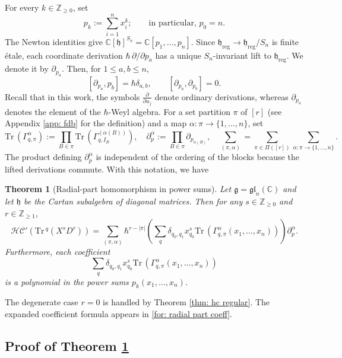 \documentclass[11pt,reqno]{amsart}
\newtheorem{theorem}{Theorem}[section]
\theoremstyle{definition}
\newcommand{\bbC}{\mathbb{C}}
\newcommand{\bbZ}{\mathbb{Z}}
\newcommand{\gl}{\mathfrak{gl}}
\newcommand{\Tr}{\mathrm{Tr} \,}
\newcommand{\fkg}{\mathfrak{g}}
\newcommand{\fkh}{\mathfrak{h}}
\newcommand{\hc}{\mathcal{HC}}
\newcommand{\reg}{\mathrm{reg}}
\newcommand{\pa}{\partial}
\begin{document}
For every \(k\in\bbZ_{\geq0}\), set
\[
p_k:=\sum_{i=1}^n x_i^k;
\qquad\text{in particular, }p_0=n.
\]
The Newton identities give
\(\bbC[\fkh]^{S_n}=\bbC[p_1,\ldots,p_n]\).  Since
\(\fkh_{\reg}\to\fkh_{\reg}/S_n\) is finite \'{e}tale, each coordinate
derivation \(\hbar\,\partial/\partial p_a\) has a unique
\(S_n\)-invariant lift to \(\fkh_{\reg}\).  We denote it by
\(\partial_{p_a}\).  Then, for \(1\leq a,b\leq n\),
\[
[\partial_{p_a},p_b]=\hbar\delta_{a,b},
\qquad
[\partial_{p_a},\partial_{p_b}]=0.
\]
Recall that in this work, the symbols
\(\frac{\partial}{\partial u_j}\) denote ordinary derivations,
whereas \(\partial_{p_a}\) denotes the element of the \(\hbar\)-Weyl algebra.
For a set partition \(\pi\) of \([r]\) (see Appendix \ref{app: fdb} for the definition) and a map 
\(\alpha:\pi\to\{1,\dots,n\}\), set
\[
	\Tr(\Gamma_{q,\pi}^{\alpha})
	:=
	\prod_{B\in\pi}
	\Tr\!\left(\Gamma_{q,I_B}^{(\alpha(B))}\right),
	\quad
		\partial_p ^\alpha
	:=
	\prod_{B\in\pi}
	\partial_{p_{\alpha(B)}},
	\quad
	\sum_{(\pi,\alpha)}
	=
	\sum_{\pi\in\Pi([r])}
		\sum_{\alpha:\pi\to\{1,\dots,n\}}.
	\]
The product defining \(\partial_p^\alpha\) is independent of the
ordering of the blocks because the lifted derivations commute.
With this notation, we have

\begin{theorem}[Radial-part homomorphism in power sums]
\label{thm: radial part}
Let \(\fkg=\gl_n(\bbC)\) and let \(\fkh\) be the 
Cartan subalgebra of diagonal matrices.
Then for any \(s\in\bbZ_{\geq 0}\) and \(r \in \bbZ_{\geq 1}\),
\begin{equation*}
\hc'(\Tr^q(X^sD^r))
=
		\sum_{(\pi,\alpha)}
		\hbar^{r - |\pi|}
		\left(
		\sum_{q}
		{\delta_{q_0,q_1}} x_{q_0}^s
		\Tr(\Gamma_{q,\pi}^{\alpha}(x_1,\dots,x_n))
		\right)
		\pa^\alpha_p.
\end{equation*}
Furthermore, each coefficient
\[
\sum_q {\delta_{q_0, q_1}} x_{q_0}^s
\Tr(\Gamma_{q,\pi}^{\alpha}(x_1,\dots,x_n))
\]
is a polynomial in the power sums \(p_k(x_1,\dots,x_n)\).
\end{theorem}

The degenerate case \(r=0\) is handled by Theorem \ref{thm: hc regular}.
 The expanded coefficient formula appears in \eqref{for: radial part coeff}.



\subsection{Proof of Theorem \ref{thm: radial part}}
\end{document}

